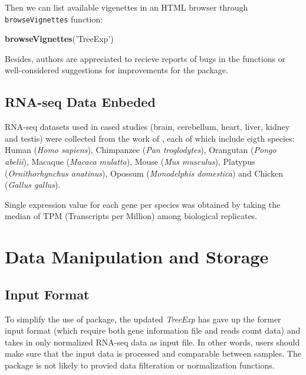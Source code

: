 \documentclass[]{book}
\newenvironment{Shaded}{\begin{snugshade}}{\end{snugshade}}
\newcommand{\KeywordTok}[1]{\textcolor[rgb]{0.13,0.29,0.53}{\textbf{#1}}}
\newcommand{\NormalTok}[1]{#1}
\newcommand{\StringTok}[1]{\textcolor[rgb]{0.31,0.60,0.02}{#1}}
\begin{document}
Then we can list available vigenettes in an HTML browser through \texttt{browseVignettes} function:

\begin{Shaded}
\begin{Highlighting}[]
\KeywordTok{browseVignettes}\NormalTok{(}\StringTok{'TreeExp'}\NormalTok{)}
\end{Highlighting}
\end{Shaded}

Besides, authors are appreciated to recieve reports of bugs in the functions or well-considered suggestions for improvements for the package.

\newpage

\hypertarget{rna-seq-data-enbeded}{%
\section{RNA-seq Data Enbeded}\label{rna-seq-data-enbeded}}

RNA-seq datasets used in cased studies (brain, cerebellum, heart, liver, kidney and testis) were collected from the work of \citep{brawand2011}, each of which include eigth species: Human (\emph{Homo sapiens}), Chimpanzee (\emph{Pan troglodytes}), Orangutan (\emph{Pongo abelii}), Macaque (\emph{Macaca mulatta}), Mouse (\emph{Mus musculus}), Platypus (\emph{Ornithorhynchus anatinus}), Opossum (\emph{Monodelphis domestica}) and Chicken (\emph{Gallus gallus}).

Single expression value for each gene per species was obtained by taking the median of TPM (Transcripts per Million) among biological replicates.

\hypertarget{data-manipulation-and-storage}{%
\chapter{Data Manipulation and Storage}\label{data-manipulation-and-storage}}

\hypertarget{input-format}{%
\section{Input Format}\label{input-format}}

To simplify the use of package, the updated \emph{TreeExp} has gave up the former input format (which require both gene information file and reads count data) and takes in only normalized RNA-seq data as input file. In other words, users should make sure that the input data is processed and comparable between samples. The package is not likely to provied data filteration or normalization functions.
\end{document}
